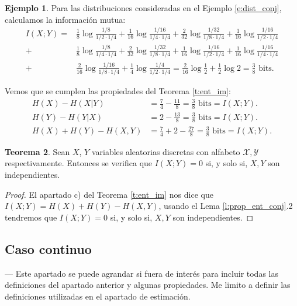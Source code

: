 \documentclass[10pt,a4paper]{article} %
\theoremstyle{definition}
\newtheorem{theorem}{Teorema}[section]
\newtheorem{example}[theorem]{Ejemplo}
\begin{document}
\begin{example}
  Para las distribuciones consideradas en el Ejemplo \ref{e:dist_conj}, calculamos la información mutua:
  \begin{align*}
    I(X;Y) =& \frac{1}{8} \log \frac{1/8}{1/2 \cdot 1/4} + \frac{1}{16} \log \frac{1/16}{1/4 \cdot 1/4} + \frac{2}{32} \log \frac{1/32}{1/8 \cdot 1/4} + \frac{1}{16} \log \frac{1/16}{1/2 \cdot 1/4}\\
    +& \frac{1}{8} \log \frac{1/8}{1/4 \cdot 1/4} + \frac{2}{32} \log \frac{1/32}{1/8 \cdot 1/4} + \frac{1}{16} \log \frac{1/16}{1/2 \cdot 1/4} + \frac{1}{16} \log \frac{1/16}{1/4 \cdot 1/4}\\
    +& \frac{2}{16} \log \frac{1/16}{1/8 \cdot 1/4} + \frac{1}{4} \log \frac{1/4}{1/2 \cdot 1/4} = \frac{2}{16} \log \frac{1}{2} + \frac{1}{2} \log 2 = \frac{3}{8} \text{ bits}.
  \end{align*}

  Vemos que se cumplen las propiedades del Teorema \ref{t:ent_im}:
  \begin{align*}
    H(X) -H(X|Y) &= \frac{7}{4} - \frac{11}{8} = \frac{3}{8} \text{ bits} = I(X;Y).\\
    H(Y) -H(Y|X) &= 2 - \frac{13}{8} = \frac{3}{8} \text{ bits} = I(X;Y).\\
    H(X) + H(Y) - H(X,Y) &= \frac{7}{4} + 2 - \frac{27}{8} = \frac{3}{8} \text{ bits} = I(X;Y).
  \end{align*}
  
\end{example}

\begin{theorem}
  Sean $X$, $Y$ variables aleatorias discretas con alfabeto $\mathcal{X}, \mathcal{Y}$ respectivamente. Entonces se verifica que $I(X;Y)=0$ si, y solo si, $X,Y$ son independientes.
\end{theorem}
\begin{proof}

El apartado c) del Teorema \ref{t:ent_im} nos dice que $I(X;Y) = H(X)+H(Y)-H(X,Y)$, usando el Lema \ref{l:prop_ent_conj}.2 tendremos que $I(X;Y)=0$ si, y solo si, $X,Y$ son independientes.
\end{proof}

\subsection{Caso continuo}
--- Este apartado se puede agrandar si fuera de interés para incluir todas las definiciones del apartado anterior y algunas propiedades. Me limito a definir las definiciones utilizadas en el apartado de estimación.
\end{document}
